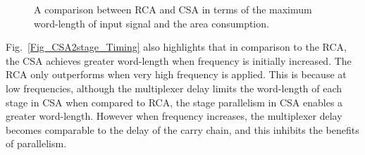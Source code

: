 \documentclass[prodmode,acmtrets]{acmsmall} %
\begin{document}
\begin{figure}[htbp]
        \centering
    \caption{A comparison between RCA and CSA in terms of the maximum word-length of input signal and the area consumption.}
\end{figure}

Fig.~\ref{Fig_CSA2stage_Timing} also highlights that in comparison to the RCA, the CSA achieves greater word-length when frequency is initially increased. The RCA only outperforms when very high frequency is applied. This is because at low frequencies, although the multiplexer delay limits the word-length of each stage in CSA when compared to RCA, the stage parallelism in CSA enables a greater word-length. However when frequency increases, the multiplexer delay becomes comparable to the delay of the carry chain, and this inhibits the benefits of parallelism.
\end{document}
